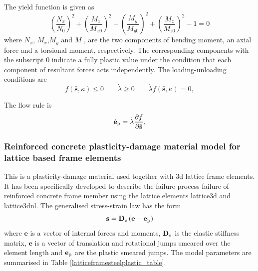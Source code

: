 \documentclass[a4paper]{article}
\begin{document}
The yield function is given as
\begin{equation}
(\dfrac{N_x}{N_0})^2+ (\dfrac{M_x}{M_{x0}})^2+ (\dfrac{M_y}{M_{y0}})^2+ (\dfrac{M_z}{M_{z0}})^2 - 1 = 0
\end{equation}
where $N_x$, $M_x$,$M_y$ and $M$ , are the two components of bending moment, an axial force and
a torsional moment, respectively. The corresponding components with the subscript 0 indicate a fully plastic value under the
condition that each component of resultant forces acts independently.
The loading-unloading conditions are
\begin{equation}
f(\bar{\mathbf{s}},\kappa)\le 0 \qquad \dot{\lambda}\geq 0 \qquad \dot{\lambda}f(\bar{\mathbf{s}},\kappa)=0,
\end{equation}

The flow rule is
\begin{equation}
\dot{\mathbf{e}}_{\rm{p}} = \dot{\lambda} \dfrac{\partial f}{\partial \bar{\mathbf{s}}},
\end{equation}

\subsubsection{Reinforced concrete plasticity-damage material model for lattice based frame elements}
This is a plasticity-damage material used together with 3d lattice frame elements. It has been specifically developed to describe the failure process failure of reinforced concrete frame member using the lattice elements lattice3d and lattice3dnl. 
The generalised stress-strain law has the form
\begin{equation}
  \mathbf{s} = \mathbf{D}_{\rm e} \left(\mathbf{e}-\mathbf{e}_{\rm p} \right)
\end{equation}
where $\mathbf{e}$ is a vector of internal forces and moments, $\mathbf{D}_{\rm e}$ is the elastic stiffness matrix, $\mathbf{e}$ is a vector of translation and rotational jumps smeared over the element length and $\mathbf{e}_{\rm p}$ are the plastic smeared jumps. The model parameters are summarised in Table \ref{latticeframesteelplastic_table}.
\end{document}
